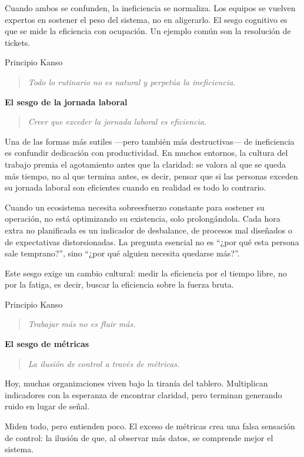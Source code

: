 Cuando ambos se confunden, la ineficiencia se normaliza. Los equipos se vuelven expertos en sostener el peso del sistema, no en aligerarlo. El sesgo cognitivo es que se mide la eficiencia con ocupación. Un ejemplo común son la resolución de tickets.

Principio Kanso
\begin{quote}
\textit{Todo lo rutinario no es natural y perpetúa la ineficiencia.}
\end{quote}

\textbf{El sesgo de la jornada laboral}
\begin{quote}
\textit{Creer que exceder la jornada laboral es eficiencia.}
\end{quote}

Una de las formas más sutiles ---pero también más destructivas--- de ineficiencia es confundir dedicación con productividad. En muchos entornos, la cultura del trabajo premia el agotamiento antes que la claridad: se valora al que se queda más tiempo, no al que termina antes, es decir, pensar que si las personas exceden su jornada laboral son eficientes cuando en realidad es todo lo contrario.

Cuando un ecosistema necesita sobreesfuerzo constante para sostener su operación, no está optimizando su existencia, solo prolongándola. Cada hora extra no planificada es un indicador de desbalance, de procesos mal diseñados o de expectativas distorsionadas. La pregunta esencial no es ``¿por qué esta persona sale temprano?'', sino ``¿por qué alguien necesita quedarse más?''.

Este sesgo exige un cambio cultural: medir la eficiencia por el tiempo libre, no por la fatiga, es decir, buscar la eficiencia sobre la fuerza bruta.

Principio Kanso
\begin{quote}
\textit{Trabajar más no es fluir más.}
\end{quote}

\textbf{El sesgo de métricas}
\begin{quote}
\textit{La ilusión de control a través de métricas.}
\end{quote}

Hoy, muchas organizaciones viven bajo la tiranía del tablero. Multiplican indicadores con la esperanza de encontrar claridad, pero terminan generando ruido en lugar de señal.

Miden todo, pero entienden poco. El exceso de métricas crea una falsa sensación de control: la ilusión de que, al observar más datos, se comprende mejor el sistema.

